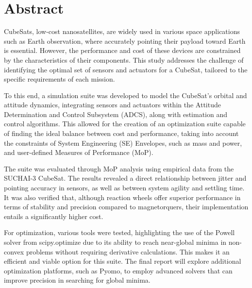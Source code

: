 \section*{Abstract}

CubeSats, low-cost nanosatellites, are widely used in various space applications such as Earth observation, where accurately pointing their payload toward Earth is essential. However, the performance and cost of these devices are constrained by the characteristics of their components. This study addresses the challenge of identifying the optimal set of sensors and actuators for a CubeSat, tailored to the specific requirements of each mission.

To this end, a simulation suite was developed to model the CubeSat’s orbital and attitude dynamics, integrating sensors and actuators within the Attitude Determination and Control Subsystem (ADCS), along with estimation and control algorithms. This allowed for the creation of an optimization suite capable of finding the ideal balance between cost and performance, taking into account the constraints of System Engineering (SE) Envelopes, such as mass and power, and user-defined Measures of Performance (MoP).

The suite was evaluated through MoP analysis using empirical data from the SUCHAI-3 CubeSat. The results revealed a direct relationship between jitter and pointing accuracy in sensors, as well as between system agility and settling time. It was also verified that, although reaction wheels offer superior performance in terms of stability and precision compared to magnetorquers, their implementation entails a significantly higher cost.

For optimization, various tools were tested, highlighting the use of the Powell solver from scipy.optimize due to its ability to reach near-global minima in non-convex problems without requiring derivative calculations. This makes it an efficient and viable option for this suite. The final report will explore additional optimization platforms, such as Pyomo, to employ advanced solvers that can improve precision in searching for global minima.




